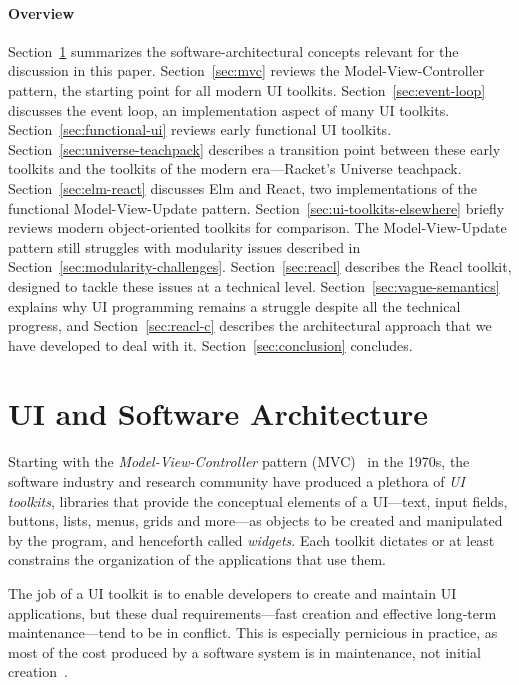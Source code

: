 \documentclass[sigplan,review,screen]{acmart}
\begin{document}
\paragraph{Overview} Section~\ref{sec:ui-and-architecture} summarizes
the software-architectural concepts relevant for the discussion in
this paper.  Section~\ref{sec:mvc} reviews the Model-View-Controller
pattern, the starting point for all modern UI toolkits.
Section~\ref{sec:event-loop} discusses the event loop, an
implementation aspect of many UI toolkits.  Section~\ref{sec:functional-ui} reviews
early functional UI toolkits.  Section~\ref{sec:universe-teachpack}
describes a transition point between these early toolkits and the
toolkits of the modern era---Racket's Universe teachpack.
Section~\ref{sec:elm-react} discusses Elm and React, two
implementations of the functional Model-View-Update pattern.
Section~\ref{sec:ui-toolkits-elsewhere} briefly reviews modern
object-oriented toolkits for comparison.  The Model-View-Update
pattern still struggles with modularity issues described in
Section~\ref{sec:modularity-challenges}.  Section~\ref{sec:reacl}
describes the Reacl toolkit, designed to tackle these issues at a
technical level.  Section~\ref{sec:vague-semantics} explains why UI
programming remains a struggle despite all the technical progress, and
Section~\ref{sec:reacl-c} describes the architectural approach that we
have developed to deal with it.  Section~\ref{sec:conclusion} concludes.


\section{UI and Software Architecture}
\label{sec:ui-and-architecture}

Starting with the \textit{Model-View-Controller} pattern
(MVC)~\cite{MVC} in the 1970s, the software
industry and research community have produced a plethora of \textit{UI
  toolkits}, libraries that provide the conceptual elements of a
UI---text, input fields, buttons, lists, menus, grids and more---as
objects to be created and manipulated by the program, and henceforth
called \textit{widgets}.  Each toolkit dictates or at least
constrains the organization of the applications that use them.

The job of a UI toolkit is to enable developers to create and maintain
UI applications, but these dual requirements---fast creation and
effective long-term maintenance---tend to be in conflict.  This is especially pernicious in
practice, as most of the cost produced by a software system is in
maintenance, not initial creation~\cite{GreenBook}.
\end{document}
